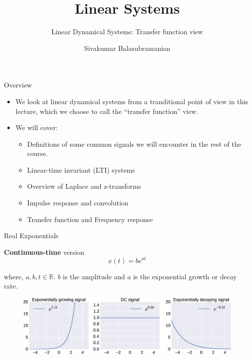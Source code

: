 \documentclass[aspectratio=169]{beamer}
\title{Linear Systems}
\subtitle{Linear Dynamical Systems: Transfer function view}
\author{Sivakumar Balasubramanian}
\institute[Christian Medical College] %
{
  \inst{}%
  Department of Bioengineering\\
  Christian Medical College, Bagayam\\
  Vellore 632002
}
\date{}
\begin{document}

\begin{frame}
  \titlepage
\end{frame}

\begin{frame}{Overview}
\begin{itemize}
    \item We look at linear dynamical systems from a tranditional point of view in this lecture, which we choose to call the ``transfer function'' view.
    \item We will cover: 
    \begin{itemize}
        \item Definitions of some common signals we will encounter in the rest of the course.
        \item Linear-time invariant (LTI) systems
        \item Overview of Laplace and z-transforms
        \item Impulse response and convolution
        \item Transfer function and Frequency response
    \end{itemize} 
\end{itemize}
\end{frame}

\begin{frame}{Real Exponentials}

\textbf{Continuous-time} version
\[ x(t) = be^{at} \]

where, $a, b, t \in \mathbb{R}$. $b$ is the amplitude and $a$ is the exponential growth or decay rate.

\begin{figure}
\includegraphics[width=\textwidth]{img/exp.eps}
\end{figure}
\end{frame}
\end{document}
